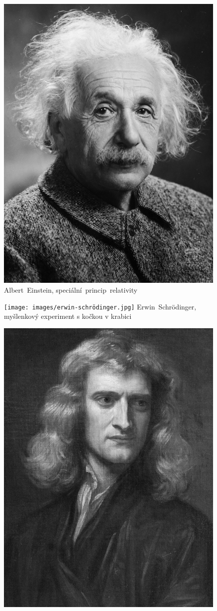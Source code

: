 \documentclass{../../../../style/mkimain}
\begin{document}
\begin{figure}[H]
  \begin{center}
    \includegraphics[width=0.8\linewidth]{images/albert-einstein.jpeg}
      Albert~Einstein, speciální~princip~relativity
      \end{center}
  \endminipage\hfill
  \begin{center}
    \texttt{[image: images/erwin-schrödinger.jpg]}
        Erwin~Schrödinger, myšlenkový experiment s kočkou v krabici
      \end{center}
  \endminipage\hfill
  \begin{center}
    \includegraphics[width=0.8\linewidth]{images/isaac-newton.jpg}

\end{center}
\end{figure}
\end{document}
